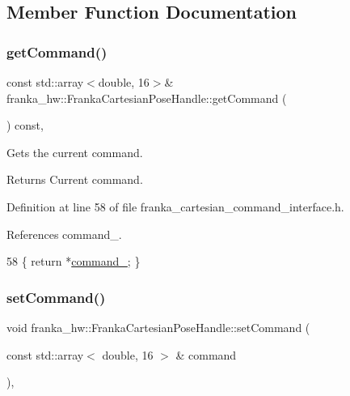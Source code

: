 \subsection{Member Function Documentation}
\mbox{\label{classfranka__hw_1_1FrankaCartesianPoseHandle_a844b5a45c8a54f6930c23d0161fdc30d}} 
\subsubsection{\texorpdfstring{get\+Command()}{getCommand()}}
{\footnotesize\ttfamily const std\+::array$<$double, 16$>$\& franka\+\_\+hw\+::\+Franka\+Cartesian\+Pose\+Handle\+::get\+Command (\begin{DoxyParamCaption}{ }\end{DoxyParamCaption}) const\hspace{0.3cm}{\ttfamily [inline]}, {\ttfamily [noexcept]}}

Gets the current command.

\begin{DoxyReturn}{Returns}
Current command. 
\end{DoxyReturn}


Definition at line 58 of file franka\+\_\+cartesian\+\_\+command\+\_\+interface.\+h.



References command\+\_\+.


\begin{DoxyCode}
58 \{ \textcolor{keywordflow}{return} *\hyperlink{classfranka__hw_1_1FrankaCartesianPoseHandle_a241d690f13da4ef26f80e893072e9584}{command\_}; \}
\end{DoxyCode}
\mbox{\label{classfranka__hw_1_1FrankaCartesianPoseHandle_a37b091755da28b088892e79c984e0634}} 
\subsubsection{\texorpdfstring{set\+Command()}{setCommand()}\hspace{0.1cm}{\footnotesize\ttfamily [1/2]}}
{\footnotesize\ttfamily void franka\+\_\+hw\+::\+Franka\+Cartesian\+Pose\+Handle\+::set\+Command (\begin{DoxyParamCaption}\item[{const std\+::array$<$ double, 16 $>$ \&}]{command }\end{DoxyParamCaption})\hspace{0.3cm}{\ttfamily [inline]}, {\ttfamily [noexcept]}}

